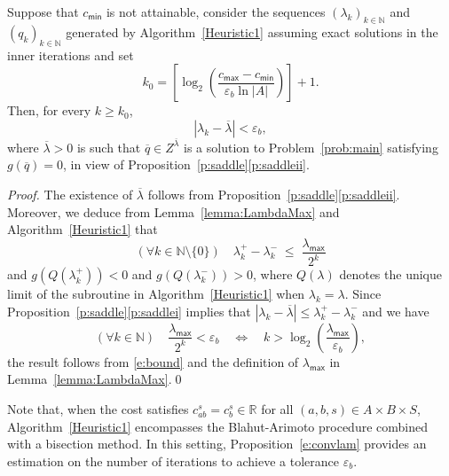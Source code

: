 \documentclass[smallextended,referee,envcountsect,]{svjour3}
\newcommand{\NN}{{\mathbb N}}
\begin{document}
\begin{proposition}
\label{e:convlam}
Suppose that $c_{\mathsf{min}}$ is not attainable, consider the 
sequences $(\lambda_k)_{k\in\NN}$ and $(q_k)_{k\in\NN}$ 
generated by Algorithm~\ref{Heuristic1} {assuming exact 
solutions in the inner iterations} and set
\begin{equation}
\label{e:defk0}
k_0=\left[\log_2 \left(\frac{c_{\mathsf{max}} - 
c_{\mathsf{min}}}{\varepsilon_b \ln |A|}\right)\right]+1.
\end{equation}
 Then, for every $k\ge k_0$, 
$$|\lambda_k-\overline{\lambda}|<\varepsilon_b,$$
where $\overline{\lambda}>0$ is such that $\overline{q}\in 
Z^{\overline{\lambda}}$ is a solution to Problem~\ref{prob:main} 
satisfying $g(\overline{q})=0$, in view of
Proposition~\ref{p:saddle}\eqref{p:saddleii}.
\end{proposition}
\begin{proof}
The existence of $\overline{\lambda}$ follows from 
Proposition~\ref{p:saddle}\eqref{p:saddleii}. Moreover, we deduce 
from Lemma~\ref{lemma:LambdaMax} and 
Algorithm~\ref{Heuristic1} that 
\begin{equation}
\label{e:bound}
(\forall k\in\NN{\setminus\{0\}})\quad \lambda^+_{k} - 
\lambda^-_{k} \; {\leq} \;\frac{\lambda_{\mathsf{max}}}{2^k}
\end{equation}
and $g(Q(\lambda^+_{k}))<0$ and 
$g(Q(\lambda^-_{k}))>0$, where $Q(\lambda)$ denotes the unique 
limit of the subroutine in 
Algorithm~\ref{Heuristic1} when $\lambda_k=\lambda$.
Since Proposition~\ref{p:saddle}\eqref{p:saddlei} implies 
that 
$|\lambda_k-\overline{\lambda}|\le \lambda^+_{k} - 
\lambda^-_{k}$ and we have
$$(\forall k\in\NN)\quad 
\frac{\lambda_{\mathsf{max}}}{2^k}<\varepsilon_b\quad 
\Leftrightarrow\quad k> 
\log_2\left(\frac{\lambda_{\mathsf{max}}}{\varepsilon_b}\right),$$
 the result follows from \eqref{e:bound} and  
the definition of $\lambda_{\mathsf{max}}$ in 
Lemma~\ref{lemma:LambdaMax}.\qed
\end{proof}

\begin{remark}
Note that, when the cost satisfies {$c_{ab}^s = c_b^s \in 
\mathbb{R}$ for all $(a, b, s) \in A \times B \times S$,}  
Algorithm~\ref{Heuristic1} encompasses the Blahut-Arimoto 
procedure \cite{Arimoto72,Blahut72} combined with a 
bisection 
method. In this setting, Proposition~\ref{e:convlam} provides
{an estimation on the number of iterations to achieve a tolerance 
$\varepsilon_b$}.
\end{remark}
\end{document}
